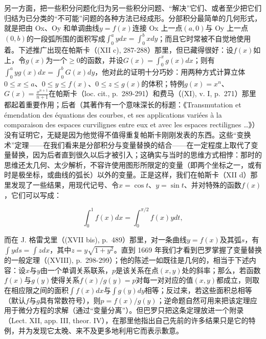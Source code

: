 另一方面，把一些积分问题化归为另一些积分问题、“解决”它们、或者至少把它们归结为已分类的“不可能”问题的各种方法已经成形。分部积分最简单的几何形式，就是把由 Ox、Oy 和单调曲线\(y = f(x)\)连接 Ox 上一点\((a, 0)\)与 Oy 上一点\((0, b)\)的一段弧所围的面积写成\(\int_{0}^{a} y dx = \int_{0}^{b} x dy\)；而且它时常被不自觉地使用着。下述推广出现在帕斯卡（(XII c), 287-288）那里，但已藏得很好：设\(f(x)\)如上，令\(g(x)\)为一个\(\geqslant 0\)的函数，并设\(G(x) = \int_{0}^{x} g(x) dx\)；则有\(\int_{0}^{a} y g(x) dx = \int_{0}^{b} G(x) dy\)，他对此的证明十分巧妙：用两种方式计算立体\(0 \leqslant x \leqslant a\)、\(0 \leqslant y \leqslant f(x)\)、\(0 \leqslant z \leqslant g(x)\)的体积；特例\(g(x) = x^{n}\)、\(G(x) = \frac{x^{n+1}}{n+1}\)在帕斯卡（loc. cit., p.~289-291）和费马（(XI), v. I, p.~271）那里都起着重要作用；后者（其著作有一个意味深长的标题：《Transmutation et émendation des équations des courbes, et ses applications variées à la comparaison des espaces curvilignes entre eux et avec les espaces rectilignes \ldots》）没有证明它，无疑是因为他觉得不值得重复帕斯卡刚刚发表的东西。这些“变换术”定理——在我们看来是分部积分与变量替换的结合——在一定程度上取代了变量替换，因为后者直到很久以后才被引入；这确实与当时的思维方式相悖：那时的思维还太几何、太少解析，不容许使用图形所限定的变量（即两个坐标之一，或有时是极坐标，或曲线的弧长）以外的变量。正是这样，我们在帕斯卡（XII d）那里发现了一些结果，用现代记号、令\(x = \cos t\)、\(y = \sin t\)、并对特殊的函数\(f(x)\)，它们可以写成：

\[
\int_ {0} ^ {1} f (x) d x = \int_ {0} ^ {\pi / 2} f (x) y d t,
\]

而在 J. 格雷戈里（(XVII bis), p.~489）那里，对一条曲线\(y = f(x)\)及其弧\(s\)，有\(\int y ds = \int z dx\)，其中\(z = y\sqrt{1 + y^2}\)。直到 1669 年我们才看到巴罗掌握了变量替换的一般定理（(XVIII), p.~298-299）；他的陈述一如既往是几何的，相当于下述内容：设\(x\)与\(y\)由一个单调关系联系，\(p\)是该关系在点\((x, y)\)处的斜率；那么，若函数\(f(x)\)与\(g(y)\)使得关系\(f(x)/g(y) = p\)对每一对对应的值\((x, y)\)都成立，则取在相应限之间的面积\(\int f(x) dx\)与\(\int g(y) dy\)相等；反过来，若这些面积总相等（默认\(f\)与\(g\)具有常数符号），则\(p = f(x)/g(y)\)；逆命题自然可用来把该定理应用于微分方程的求解（通过“变量分离”）。但巴罗只把这条定理放进一个附录（Lect. XII, app. III, theor. IV），在那里他指出自己先前的许多结果只是它的特例，并为发现它太晚、来不及更多地利用它而表示歉意。

